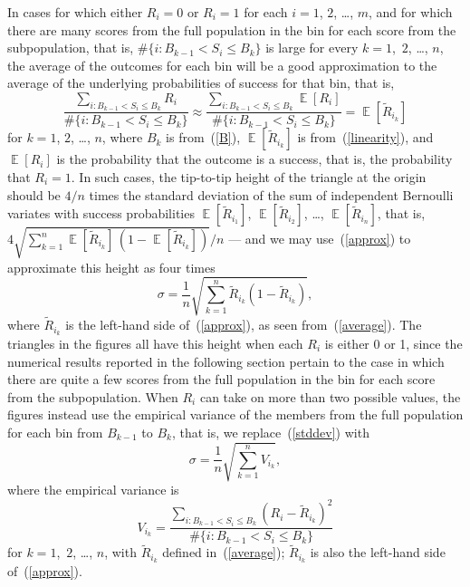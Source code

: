 \documentclass{article}
\DeclareMathOperator{\E}{\mathop{}\mathbb{E}}
\begin{document}
In cases for which either $R_i = 0$ or $R_i = 1$
for each $i = 1$, $2$, \dots, $m$,
and for which there are many scores from the full population in the bin
for each score from the subpopulation, that is, 
$\#\{i : B_{k-1} < S_i \le B_k\}$ is large for every $k = 1$,~$2$, \dots, $n$,
the average of the outcomes for each bin will be a good approximation
to the average of the underlying probabilities of success for that bin,
that is,
%
\begin{equation}
\label{approx}
\frac{\sum_{i : B_{k-1} < S_i \le B_k} R_i}{\#\{i : B_{k-1} < S_i \le B_k\}}
\approx
\frac{\sum_{i : B_{k-1} < S_i \le B_k} \E[ R_i ]}
     {\#\{i : B_{k-1} < S_i \le B_k\}}
= \E[ \tilde{R}_{i_k} ]
\end{equation}
%
for $k = 1$, $2$, \dots, $n$, where $B_k$ is from~(\ref{B}),
$\E[ \tilde{R}_{i_k} ]$ is from~(\ref{linearity}),
and $\E[ R_i ]$ is the probability that the outcome is a success,
that is, the probability that $R_i = 1$.
In such cases, the tip-to-tip height of the triangle at the origin should be
$4/n$ times the standard deviation of the sum of independent Bernoulli variates
with success probabilities $\E[ \tilde{R}_{i_1} ]$, $\E[ \tilde{R}_{i_2} ]$,
\dots, $\E[ \tilde{R}_{i_n} ]$, that is,
$4 \sqrt{\sum_{k=1}^n \E[ \tilde{R}_{i_k} ] \, (1-\E[ \tilde{R}_{i_k} ])} / n$
--- and we may use~(\ref{approx}) to approximate this height as four times
%
\begin{equation}
\label{stddev}
\sigma = \frac{1}{n} \sqrt{\sum_{k=1}^n \tilde{R}_{i_k} (1-\tilde{R}_{i_k})},
\end{equation}
%
where $\tilde{R}_{i_k}$ is the left-hand side of~(\ref{approx}),
as seen from~(\ref{average}).
The triangles in the figures all have this height
when each $R_i$ is either 0 or 1,
since the numerical results reported in the following section
pertain to the case in which there are quite a few scores
from the full population in the bin for each score from the subpopulation.
When $R_i$ can take on more than two possible values,
the figures instead use the empirical variance
of the members from the full population for each bin from $B_{k-1}$ to $B_k$,
that is, we replace~(\ref{stddev}) with
%
\begin{equation}
\label{empiricalstddev}
\sigma = \frac{1}{n} \sqrt{\sum_{k=1}^n V_{i_k}},
\end{equation}
%
where the empirical variance is
%
\begin{equation}
V_{i_k} = \frac{\sum_{i : B_{k-1} < S_i \le B_k} (R_i - \tilde{R}_{i_k})^2}
               {\#\{i : B_{k-1} < S_i \le B_k\}}
\end{equation}
%
for $k = 1$,~$2$, \dots, $n$,
with $\tilde{R}_{i_k}$ defined in~(\ref{average});
$\tilde{R}_{i_k}$ is also the left-hand side of~(\ref{approx}).
\end{document}
